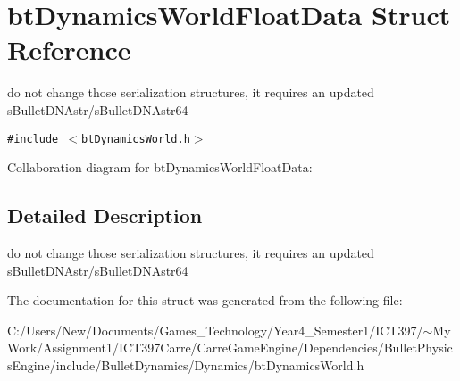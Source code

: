 \hypertarget{structbt_dynamics_world_float_data}{
\section{btDynamicsWorldFloatData Struct Reference}
\label{structbt_dynamics_world_float_data}
}
do not change those serialization structures, it requires an updated sBulletDNAstr/sBulletDNAstr64  


{\tt \#include $<$btDynamicsWorld.h$>$}

Collaboration diagram for btDynamicsWorldFloatData:

\subsection{Detailed Description}
do not change those serialization structures, it requires an updated sBulletDNAstr/sBulletDNAstr64 

The documentation for this struct was generated from the following file:\begin{CompactItemize}
\item 
C:/Users/New/Documents/Games\_\-Technology/Year4\_\-Semester1/ICT397/$\sim$My Work/Assignment1/ICT397Carre/CarreGameEngine/Dependencies/BulletPhysicsEngine/include/BulletDynamics/Dynamics/btDynamicsWorld.h\end{CompactItemize}
